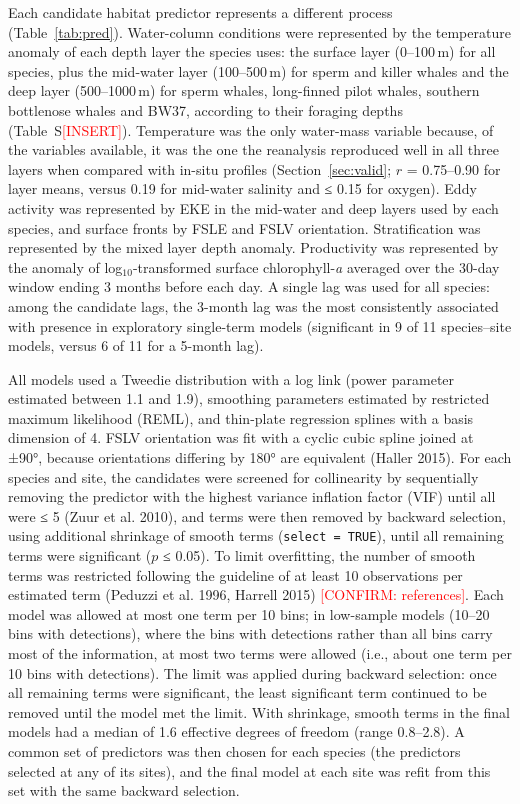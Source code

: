 \documentclass[11pt]{article}
\newcommand{\ins}[1]{\textcolor{red}{[#1]}}
\newcommand{\conf}[1]{\textcolor{red}{[CONFIRM: #1]}}
\newcommand{\chla}{chlorophyll-\textit{a}}
\newcommand{\unit}[1]{\,#1}
\begin{document}
Each candidate habitat predictor represents a different process (Table~\ref{tab:pred}). Water-column conditions were represented by the temperature anomaly of each depth layer the species uses: the surface layer (0--100\unit{m}) for all species, plus the mid-water layer (100--500\unit{m}) for sperm and killer whales and the deep layer (500--1000\unit{m}) for sperm whales, long-finned pilot whales, southern bottlenose whales and BW37, according to their foraging depths (Table~S\ins{INSERT}). Temperature was the only water-mass variable because, of the variables available, it was the one the reanalysis reproduced well in all three layers when compared with in-situ profiles (Section~\ref{sec:valid}; $r$ = 0.75--0.90 for layer means, versus 0.19 for mid-water salinity and ≤ 0.15 for oxygen). Eddy activity was represented by EKE in the mid-water and deep layers used by each species, and surface fronts by FSLE and FSLV orientation. Stratification was represented by the mixed layer depth anomaly. Productivity was represented by the anomaly of log$_{10}$-transformed surface \chla{} averaged over the 30-day window ending 3 months before each day. A single lag was used for all species: among the candidate lags, the 3-month lag was the most consistently associated with presence in exploratory single-term models (significant in 9 of 11 species--site models, versus 6 of 11 for a 5-month lag).

All models used a Tweedie distribution with a log link (power parameter estimated between 1.1 and 1.9), smoothing parameters estimated by restricted maximum likelihood (REML), and thin-plate regression splines with a basis dimension of 4. FSLV orientation was fit with a cyclic cubic spline joined at ±90°, because orientations differing by 180° are equivalent (Haller 2015). For each species and site, the candidates were screened for collinearity by sequentially removing the predictor with the highest variance inflation factor (VIF) until all were ≤ 5 (Zuur et al. 2010), and terms were then removed by backward selection, using additional shrinkage of smooth terms (\texttt{select = TRUE}), until all remaining terms were significant ($p$ ≤ 0.05). To limit overfitting, the number of smooth terms was restricted following the guideline of at least 10 observations per estimated term (Peduzzi et al. 1996, Harrell 2015) \conf{references}. Each model was allowed at most one term per 10 bins; in low-sample models (10--20 bins with detections), where the bins with detections rather than all bins carry most of the information, at most two terms were allowed (i.e., about one term per 10 bins with detections). The limit was applied during backward selection: once all remaining terms were significant, the least significant term continued to be removed until the model met the limit. With shrinkage, smooth terms in the final models had a median of 1.6 effective degrees of freedom (range 0.8--2.8). A common set of predictors was then chosen for each species (the predictors selected at any of its sites), and the final model at each site was refit from this set with the same backward selection.
\end{document}
